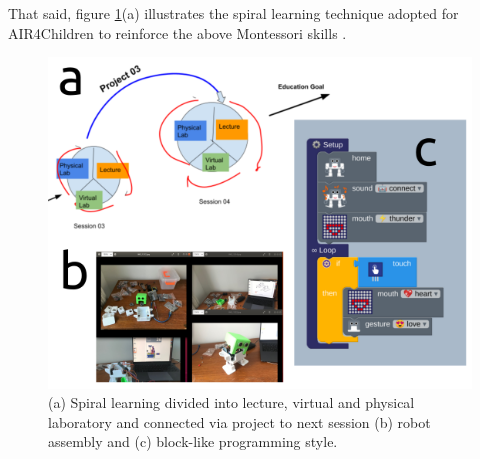 \documentclass[sigconf]{acmart}
\begin{document}
That said, figure \ref{fig:tm}(a) illustrates the spiral learning technique adopted for AIR4Children to reinforce the above Montessori skills \cite{tarik2017}.
\begin{figure}[h]
  \centering
  \includegraphics[width=\linewidth]{../figures/teaching-materials/versions/drawing-v00.png}
  \caption{(a) Spiral learning divided into lecture, virtual and physical laboratory and connected via project to next session \cite{tarik2017} (b) robot assembly and (c) block-like programming style.}
  \label{fig:tm}
\end{figure}
 


\end{document}

